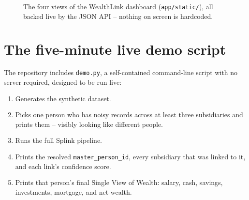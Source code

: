 \documentclass[11pt]{report}
\newcommand{\code}[1]{\lstinline[style=plain]!#1!}
\begin{document}
\begin{figure}[h]
\centering
{}
\caption{The four views of the WealthLink dashboard (\texttt{app/static/}), all backed live by the JSON API -- nothing on screen is hardcoded.}
\label{fig:dashboard-tour}
\end{figure}

\section{The five-minute live demo script}

The repository includes \texttt{demo.py}, a self-contained command-line script with no server required, designed to be run live:

\begin{enumerate}
\item Generates the synthetic dataset.
\item Picks one person who has noisy records across at least three subsidiaries and prints them -- visibly looking like different people.
\item Runs the full Splink pipeline.
\item Prints the resolved \code{master_person_id}, every subsidiary that was linked to it, and each link's confidence score.
\item Prints that person's final Single View of Wealth: salary, cash, savings, investments, mortgage, and net wealth.
\end{enumerate}
\end{document}
